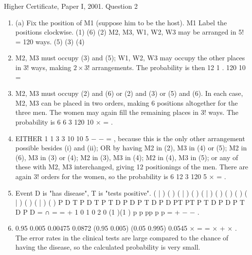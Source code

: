 \documentclass[a4paper,12pt]{article}
\begin{document}
Higher Certificate, Paper I, 2001. Question 2
\begin{enumerate}
    \item (a) Fix the position of M1 (suppose him to be the host).
M1 Label the positions clockwise.
(1)
(6) (2) M2, M3, W1, W2, W3 may be arranged in 5! =
120 ways.
(5) (3)
(4)
   \item M2, M3 must occupy (3) and (5); W1, W2, W3 may occupy the other
places in 3! ways, making $2×3!$ arrangements. The probability is then
12 1 .
120 10
=
   \item M2, M3 must occupy (2) and (6) or (2) and (3) or (5) and (6). In each
case, M2, M3 can be placed in two orders, making 6 positions altogether for
the three men. The women may again fill the remaining places in 3! ways.
The probability is 6 6 3
120 10
× = .
   \item EITHER 1 1 3 3
10 10 5
− − = , because this is the only other arrangement
possible besides (i) and (ii);
OR by having M2 in (2), M3 in (4) or (5); M2 in (6), M3 in (3) or (4); M2 in
(3), M3 in (4); M2 in (4), M3 in (5); or any of these with M2, M3 interchanged,
giving 12 positionings of the men. There are again 3! orders for the women,
so the probability is 6 12 3
120 5
× = .
   \item Event D is "has disease", T is "tests positive".
( | ) ( ) ( | ) ( ) ( | ) ( )
( ) ( ) ( | ) ( ) ( | ) ( )
P D T P D T P T D P D P T D P D
PT PT P T D P D P T D P D
= ∩ = =
+
1 0
1 0 2 0 (1 )(1 )
p p
pp p p
=
+ − −
.
   \item 0.95 0.005 0.00475 0.0872
(0.95 0.005) (0.05 0.995) 0.0545
× = =
× + ×
.
The error rates in the clinical tests are large compared to the chance of having
the disease, so the calculated probability is very small.
\end{enumerate}
\end{document}
